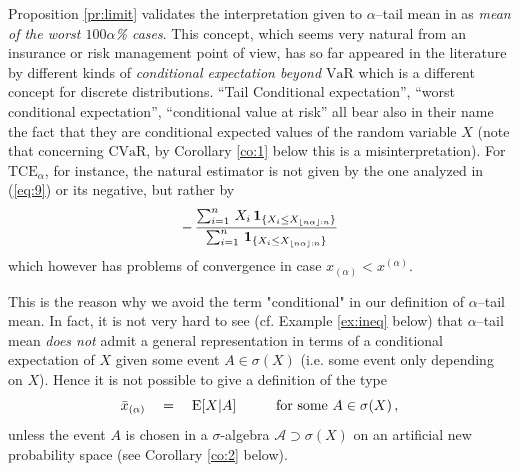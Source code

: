 \documentclass[11pt,a4paper,leqno]{article}
\begin{document}
Proposition \ref{pr:limit} validates the interpretation given to $\alpha$--tail mean in \cite{ANS} as 
{\em mean of the worst $100 \alpha$\% cases}. This concept, which seems very natural from an 
insurance or risk management point of view, has so far  
appeared in the literature by different kinds of {\em conditional expectation beyond $\mathrm{VaR}$} 
which is a different concept for discrete distributions. ``Tail Conditional expectation'', 
``worst conditional expectation'', ``conditional value at risk'' all bear also in their name 
the fact that they are conditional expected values of the random variable $X$ (note that concerning 
$\mathrm{CVaR}$, by Corollary \ref{co:1} below this is a misinterpretation). For $\mathrm{TCE}_\alpha$, 
for instance, the natural estimator is not given by the one analyzed in (\ref{eq:9}) or its negative, but rather by
\begin{equation}
-\, \frac{\sum_{i=1}^n \, X_i \, {\bf 1}_{\{X_i \leq X_{\lfloor n\alpha \rfloor:n}\}}}{\sum_{i=1}^n \,  
{\bf 1}_{\{X_i \leq X_{\lfloor n\alpha \rfloor:n}\}}}
\end{equation}
which however has problems of convergence in case $x_{(\alpha)} < x^{(\alpha)}$.


This is the reason why we avoid the term "conditional" in our definition of $\alpha$--tail mean. In fact, it is not very hard
 to see (cf. Example \ref{ex:ineq} below) that $\alpha$--tail mean 
{\em does not} admit  a general representation in terms of a conditional expectation of $X$
given some event $A \in \sigma(X)$ (i.e. some event only depending on $X$). Hence it is not possible to give a definition of the type
\begin{equation}
\bar{x}_{(\alpha)}\quad = \quad
\mathrm{E}[ X | A]  \hspace{10mm} \mbox{for some}\ A \in  \sigma(X) \, ,
\end{equation}
unless the event $A$ is chosen  in a  $\sigma$-algebra $\mathcal{A} \supset \sigma(X)$ 
on an artificial new probability space (see Corollary \ref{co:2} below).

\end{document}
